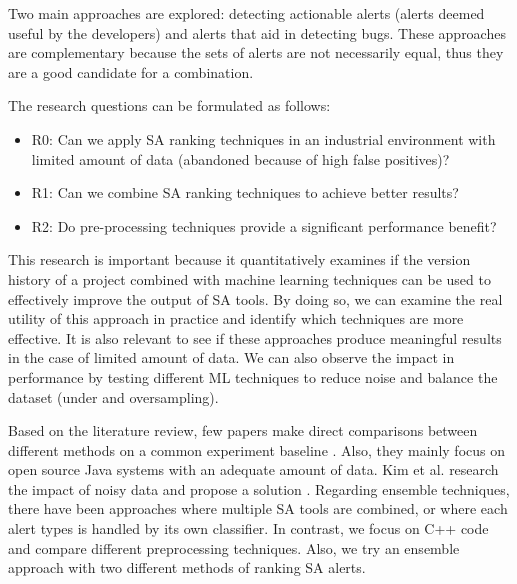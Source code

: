 Two main approaches are explored: detecting actionable alerts (alerts deemed useful by the developers) and alerts that aid in detecting bugs. These approaches are complementary because the sets of alerts are not necessarily equal, thus they are a good candidate for a combination.

The research questions can be formulated as follows:
\begin{itemize}
    \item R0: Can we apply SA ranking techniques in an industrial environment with limited amount of data (abandoned because of high false positives)?
    \item R1: Can we combine SA ranking techniques to achieve better results?
    \item R2: Do pre-processing techniques provide a significant performance benefit?
\end{itemize}

This research is important because it quantitatively examines if the version history of a project combined with machine learning techniques can be used to effectively improve the output of SA tools. By doing so, we can examine the real utility of this approach in practice and identify which techniques are more effective. It is also relevant to see if these approaches produce meaningful results in the case of limited amount of data. We can also observe the impact in performance by testing different ML techniques to reduce noise and balance the dataset (under and oversampling). 

Based on the literature review, few papers make direct comparisons between different methods on a common experiment baseline \cite{comparative_heckman, compare_framework}. Also, they mainly focus on open source Java systems with an adequate amount of data. Kim et al. \cite{noise_defect} research the impact of noisy data and propose a solution . Regarding ensemble techniques, there have been approaches where multiple SA tools are combined, or where each alert types is handled by its own classifier. In contrast, we focus on C++ code and compare different preprocessing techniques. Also, we try an ensemble approach with two different methods of ranking SA alerts.

